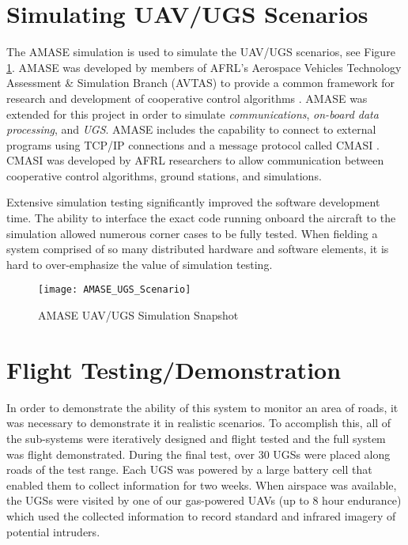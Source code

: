 \documentclass[letterpaper, 12 pt, conference]{ieeeconf}  %
\theoremstyle{definition}
\begin{document}
\section{Simulating UAV/UGS Scenarios\label{sec:Simulation}}
The AMASE simulation is used to simulate the UAV/UGS scenarios, see Figure \ref{fig:AMASE_UAV_UGS_Simulation_Snapshot}. AMASE was developed by members of AFRL's Aerospace Vehicles Technology Assessment \& Simulation Branch (AVTAS) to provide a common framework for research and development of cooperative control algorithms \cite{DuquetteMST:2009}. AMASE was extended for this project in order to simulate \emph{communications}, \emph{on-board data processing}, and \emph{UGS}. AMASE includes the capability to connect to external programs using TCP/IP connections and a message protocol called CMASI \cite{Duquette:2010}. CMASI was developed by AFRL researchers to allow communication between cooperative control algorithms, ground stations, and simulations.

Extensive simulation testing significantly improved the software development time. The ability to interface the exact code running onboard the aircraft to the simulation allowed numerous corner cases to be fully tested. When fielding a system comprised of so many distributed hardware and software elements, it is hard to over-emphasize the value of simulation testing.

\begin{figure}[htb]
\centering
      \texttt{[image: AMASE\_UGS\_Scenario]}
      \caption{AMASE UAV/UGS Simulation Snapshot}
      \label{fig:AMASE_UAV_UGS_Simulation_Snapshot}
\end{figure}




\section{Flight Testing/Demonstration\label{sec:FlightTest}}
In order to demonstrate the ability of this system to monitor an area of roads, it was necessary to demonstrate it in realistic scenarios. To accomplish this, all of the sub-systems were iteratively designed and flight tested and the full system was flight demonstrated. During the final test, over 30 UGSs were placed along roads of the test range. Each UGS was powered by a large battery cell that enabled them to collect information for two weeks. When airspace was available, the UGSs were visited by one of our gas-powered UAVs (up to 8 hour endurance) which used the collected information to record standard and infrared imagery of potential intruders.
\end{document}
